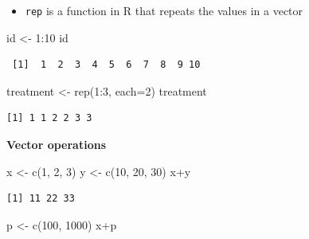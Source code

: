 \documentclass[
  letterpaper,
  DIV=11,
  numbers=noendperiod]{scrreprt}
\newenvironment{Shaded}{\begin{snugshade}}{\end{snugshade}}
\newcommand{\AttributeTok}[1]{\textcolor[rgb]{0.40,0.45,0.13}{#1}}
\newcommand{\DecValTok}[1]{\textcolor[rgb]{0.68,0.00,0.00}{#1}}
\newcommand{\FunctionTok}[1]{\textcolor[rgb]{0.28,0.35,0.67}{#1}}
\newcommand{\NormalTok}[1]{\textcolor[rgb]{0.00,0.23,0.31}{#1}}
\newcommand{\OtherTok}[1]{\textcolor[rgb]{0.00,0.23,0.31}{#1}}
\newcommand{\SpecialCharTok}[1]{\textcolor[rgb]{0.37,0.37,0.37}{#1}}
\providecommand{\tightlist}{%
  \setlength{\itemsep}{0pt}\setlength{\parskip}{0pt}}\usepackage{longtable,booktabs,array}
\begin{document}
\begin{itemize}
\tightlist
\item
  \texttt{rep} is a function in R that repeats the values in a vector
\end{itemize}

\begin{Shaded}
\begin{Highlighting}[]
\NormalTok{id }\OtherTok{\textless{}{-}} \DecValTok{1}\SpecialCharTok{:}\DecValTok{10}
\NormalTok{id}
\end{Highlighting}
\end{Shaded}

\begin{verbatim}
 [1]  1  2  3  4  5  6  7  8  9 10
\end{verbatim}

\begin{Shaded}
\begin{Highlighting}[]
\NormalTok{treatment }\OtherTok{\textless{}{-}} \FunctionTok{rep}\NormalTok{(}\DecValTok{1}\SpecialCharTok{:}\DecValTok{3}\NormalTok{, }\AttributeTok{each=}\DecValTok{2}\NormalTok{)}
\NormalTok{treatment}
\end{Highlighting}
\end{Shaded}

\begin{verbatim}
[1] 1 1 2 2 3 3
\end{verbatim}

\textbf{Vector operations}

\begin{Shaded}
\begin{Highlighting}[]
\NormalTok{x }\OtherTok{\textless{}{-}} \FunctionTok{c}\NormalTok{(}\DecValTok{1}\NormalTok{, }\DecValTok{2}\NormalTok{, }\DecValTok{3}\NormalTok{)}
\NormalTok{y }\OtherTok{\textless{}{-}} \FunctionTok{c}\NormalTok{(}\DecValTok{10}\NormalTok{, }\DecValTok{20}\NormalTok{, }\DecValTok{30}\NormalTok{)}
\NormalTok{x}\SpecialCharTok{+}\NormalTok{y}
\end{Highlighting}
\end{Shaded}

\begin{verbatim}
[1] 11 22 33
\end{verbatim}

\begin{Shaded}
\begin{Highlighting}[]
\NormalTok{p }\OtherTok{\textless{}{-}} \FunctionTok{c}\NormalTok{(}\DecValTok{100}\NormalTok{, }\DecValTok{1000}\NormalTok{)}
\NormalTok{x}\SpecialCharTok{+}\NormalTok{p}
\end{Highlighting}
\end{Shaded}
\end{document}
